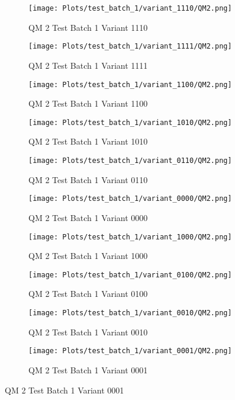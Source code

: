 \documentclass{DissertateFigs}
\begin{document}
\begin{figure}[t!]
    \begin{subfigure}{0.47\textwidth}
    \texttt{[image: Plots/test\_batch\_1/variant\_1110/QM2.png]}
    \caption{QM 2 Test Batch 1 Variant 1110}
    \end{subfigure}
    \begin{subfigure}{0.47\textwidth}
    \texttt{[image: Plots/test\_batch\_1/variant\_1111/QM2.png]}
    \caption{QM 2 Test Batch 1 Variant 1111}
    \end{subfigure}

\medskip

    \begin{subfigure}{0.47\textwidth}
    \texttt{[image: Plots/test\_batch\_1/variant\_1100/QM2.png]}
    \caption{QM 2 Test Batch 1 Variant 1100}
    \end{subfigure}
    \begin{subfigure}{0.47\textwidth}
    \texttt{[image: Plots/test\_batch\_1/variant\_1010/QM2.png]}
    \caption{QM 2 Test Batch 1 Variant 1010}
    \end{subfigure}

\medskip

    \begin{subfigure}{0.47\textwidth}
    \texttt{[image: Plots/test\_batch\_1/variant\_0110/QM2.png]}
    \caption{QM 2 Test Batch 1 Variant 0110}
    \end{subfigure}
    \begin{subfigure}{0.47\textwidth}
    \texttt{[image: Plots/test\_batch\_1/variant\_0000/QM2.png]}
    \caption{QM 2 Test Batch 1 Variant 0000}
    \end{subfigure}

\medskip

    \begin{subfigure}{0.47\textwidth}
    \texttt{[image: Plots/test\_batch\_1/variant\_1000/QM2.png]}
    \caption{QM 2 Test Batch 1 Variant 1000}
    \end{subfigure}
    \begin{subfigure}{0.47\textwidth}
    \texttt{[image: Plots/test\_batch\_1/variant\_0100/QM2.png]}
    \caption{QM 2 Test Batch 1 Variant 0100}
    \end{subfigure}

\medskip

    \begin{subfigure}{0.47\textwidth}
    \texttt{[image: Plots/test\_batch\_1/variant\_0010/QM2.png]}
    \caption{QM 2 Test Batch 1 Variant 0010}
    \end{subfigure}
    \begin{subfigure}{0.47\textwidth}
    \texttt{[image: Plots/test\_batch\_1/variant\_0001/QM2.png]}
    \caption{QM 2 Test Batch 1 Variant 0001}
    \end{subfigure}


\end{figure}
\end{document}

